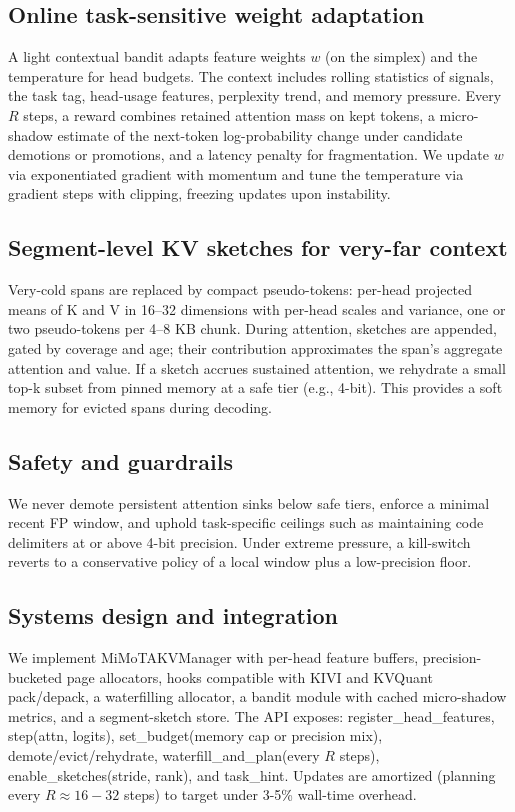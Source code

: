 \documentclass{article} %
\begin{document}
\subsection{Online task-sensitive weight adaptation}
A light contextual bandit adapts feature weights \(w\) (on the simplex) and the temperature for head budgets. The context includes rolling statistics of signals, the task tag, head-usage features, perplexity trend, and memory pressure. Every \(R\) steps, a reward combines retained attention mass on kept tokens, a micro-shadow estimate of the next-token log-probability change under candidate demotions or promotions, and a latency penalty for fragmentation. We update \(w\) via exponentiated gradient with momentum and tune the temperature via gradient steps with clipping, freezing updates upon instability.

\subsection{Segment-level KV sketches for very-far context}
Very-cold spans are replaced by compact pseudo-tokens: per-head projected means of K and V in 16–32 dimensions with per-head scales and variance, one or two pseudo-tokens per 4–8 KB chunk. During attention, sketches are appended, gated by coverage and age; their contribution approximates the span’s aggregate attention and value. If a sketch accrues sustained attention, we rehydrate a small top-k subset from pinned memory at a safe tier (e.g., 4-bit). This provides a soft memory for evicted spans during decoding.

\subsection{Safety and guardrails}
We never demote persistent attention sinks below safe tiers, enforce a minimal recent FP window, and uphold task-specific ceilings such as maintaining code delimiters at or above 4-bit precision. Under extreme pressure, a kill-switch reverts to a conservative policy of a local window plus a low-precision floor.

\subsection{Systems design and integration}
We implement MiMoTAKVManager with per-head feature buffers, precision-bucketed page allocators, hooks compatible with KIVI and KVQuant pack/depack, a waterfilling allocator, a bandit module with cached micro-shadow metrics, and a segment-sketch store. The API exposes: register\_head\_features, step(attn, logits), set\_budget(memory cap or precision mix), demote/evict/rehydrate, waterfill\_and\_plan(every \(R\) steps), enable\_sketches(stride, rank), and task\_hint. Updates are amortized (planning every \(R\approx16{-}32\) steps) to target under 3{-}5\% wall-time overhead.
\end{document}
